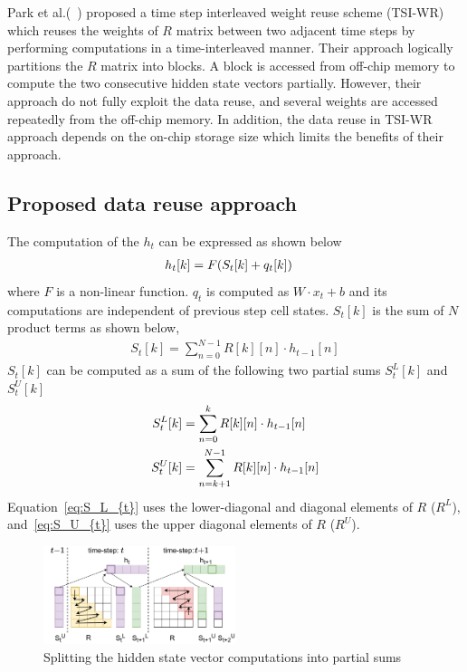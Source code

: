 \documentclass[a4paper,10pt]{article}
\begin{document}
Park et al.(~\cite{park2020time}) proposed a time step interleaved weight reuse scheme (TSI-WR) which reuses the weights of $R$ matrix between two adjacent time steps by performing computations in a time-interleaved manner. Their approach logically partitions the $R$ matrix into blocks. A block is accessed from off-chip memory to compute the two consecutive hidden state vectors partially. However, their approach do not fully exploit the data reuse, and several weights are accessed repeatedly from the off-chip memory. In addition, the data reuse in TSI-WR approach depends on the on-chip storage size which limits the benefits of their approach.
\subsection{Proposed data reuse approach}
The computation of the $h_t$ can be expressed as shown below
\begin{align}\label{eq:h_{t}}
	h_{t}[k] &= F( S_{t}[k]+q_{t}[k])
\end{align}
where $F$ is a non-linear function. $q_{t}$ is computed as $W{\cdot}x_t{+}b$ and its computations are independent of previous step cell states. $S_{t}[k]$ is the sum of $N$ product terms as shown below,
\begin{align}
	S_{t}[k] = \sum_{n=0}^{N-1}R[k][n]\cdot h_{t-1}[n]
\end{align}
$S_{t}[k]$ can be computed as a sum of the following two partial sums $S_{t}^{L}[k]$ and $S_{t}^{U}[k]$
\begin{align}      
	S_{t}^{L}[k] &= \sum_{n=0}^{k}R[k][n]\cdot h_{t-1}[n] \label{eq:S_L_{t}}\\
	S_{t}^{U}[k] &= \sum_{n=k+1}^{N-1}R[k][n]\cdot h_{t-1}[n] \label{eq:S_U_{t}}
\end{align}
Equation~\eqref{eq:S_L_{t}} uses the lower-diagonal and diagonal elements of $R$ ($R^L$), and~\eqref{eq:S_U_{t}} uses the upper diagonal elements of $R$ ($R^U$). 
\begin{figure}[!htb]
	\centerline{\includegraphics[width=0.5\textwidth]{TwoTimeSteps.pdf}}
	\caption{Splitting the hidden state vector computations into partial sums}
	\label{fig:TwoTimeStepsComputation}
	\vspace{-1.0em}	
\end{figure}
\end{document}
